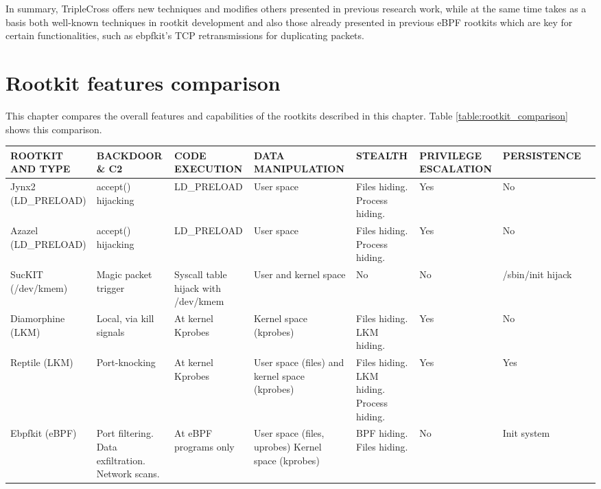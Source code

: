 In summary, TripleCross offers new techniques and modifies others presented in previous research work, while at the same time takes as a basis both well-known techniques in rootkit development and also those already presented in previous eBPF rootkits which are key for certain functionalities, such as ebpfkit's TCP retransmissions for duplicating packets.


\section{Rootkit features comparison}
This chapter compares the overall features and capabilities of the rootkits described in this chapter. Table \ref{table:rootkit_comparison} shows this comparison.

\thispagestyle{lscape}
\begin{landscape}
\begin{table}[htbp]
\begin{tabular}{|>{\centering\arraybackslash}p{3cm}|>{\centering\arraybackslash}p{3cm}|>{\centering\arraybackslash}p{3cm}|>{\centering\arraybackslash}p{3cm}|>{\centering\arraybackslash}p{3cm}|>{\centering\arraybackslash}p{3cm}|>{\centering\arraybackslash}p{3cm}|>{\centering\arraybackslash}p{3cm}|}
\hline
\textbf{ROOTKIT AND TYPE} & \textbf{BACKDOOR \& C2} & \textbf{CODE EXECUTION} & \textbf{DATA MANIPULATION} & \textbf{STEALTH} & \textbf{PRIVILEGE ESCALATION} & \textbf{PERSISTENCE}\\
\hline
\hline
Jynx2 (LD\_PRELOAD) & accept() hijacking & LD\_PRELOAD & User space & Files hiding. Process hiding. & Yes & No\\
\hline
Azazel (LD\_PRELOAD) & accept() hijacking & LD\_PRELOAD & User space & Files hiding. Process hiding. & Yes & No\\
\hline
SucKIT (/dev/kmem) & Magic packet trigger & Syscall table hijack with /dev/kmem & User and kernel space & No & No & /sbin/init hijack\\
\hline
Diamorphine (LKM) & Local, via kill signals & At kernel Kprobes & Kernel space (kprobes) & Files hiding. LKM hiding. & Yes & No\\
\hline
Reptile (LKM) & Port-knocking & At kernel Kprobes & User space (files) and kernel space (kprobes) & Files hiding. LKM hiding. Process hiding. & Yes & Yes\\
\hline
Ebpfkit (eBPF) & Port filtering. Data exfiltration. Network scans. & At eBPF programs only & User space (files, uprobes) Kernel space (kprobes) & BPF hiding. Files hiding. & No & Init system\\

\end{tabular}
\end{table}
\end{landscape}
